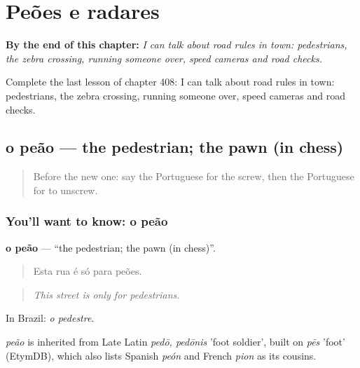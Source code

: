 
\chapter{Peões e radares}
\label{ch:pt-peoes-e-radares}

\begin{chapteropening}
\textbf{By the end of this chapter:} \emph{I can talk about road rules in town: pedestrians, the zebra crossing, running someone over, speed cameras and road checks.}

Complete the last lesson of chapter 408: I can talk about road rules in town: pedestrians, the zebra crossing, running someone over, speed cameras and road checks.
\end{chapteropening}

\section[o peão]{o peão — the pedestrian; the pawn (in chess)}

\label{lesson:PT-C408-peao}



\begin{quote}
Before the new one: say the Portuguese for the screw, then the Portuguese for to unscrew.
\end{quote}

\subsection*{You'll want to know: o peão}
\textbf{o peão} — \textquotedblleft{}the pedestrian; the pawn (in chess)\textquotedblright{}.

\begin{quote}
Esta rua é só para peões.
\end{quote}

\begin{quote}
\emph{This street is only for pedestrians.}
\end{quote}

In Brazil: \emph{o pedestre}.

\begin{cousinweb}
\emph{peão} is inherited from Late Latin \emph{pedō, pedōnis} 'foot soldier', built on \emph{pēs} 'foot' (EtymDB), which also lists Spanish \emph{peón} and French \emph{pion} as its cousins.
\end{cousinweb}

